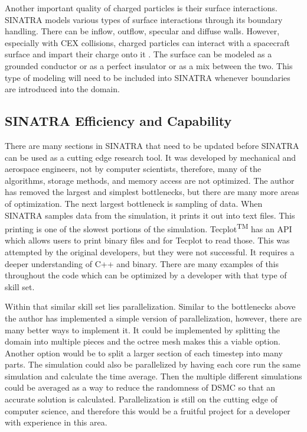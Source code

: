\indent Another important quality of charged particles is their surface interactions. SINATRA models various types of surface interactions through its boundary handling. There can be inflow, outflow, specular and diffuse walls. However, especially with CEX collisions, charged particles can interact with a spacecraft surface and impart their charge onto it \cite{surface_charge}. The surface can be modeled as a grounded conductor or as a perfect insulator or as a mix between the two. This type of modeling will need to be included into SINATRA whenever boundaries are introduced into the domain.

\subsection{SINATRA Efficiency and Capability}
\label{sec:auto_mesh}
There are many sections in SINATRA that need to be updated before SINATRA can be used as a cutting edge research tool. It was developed by mechanical and aerospace engineers, not by computer scientists, therefore, many of the algorithms, storage methods, and memory access are not optimized. The author has removed the largest and simplest bottlenecks, but there are many more areas of optimization. The next largest bottleneck is sampling of data. When SINATRA samples data from the simulation, it prints it out into text files. This printing is one of the slowest portions of the simulation. Tecplot\textsuperscript{TM} has an API which allows users to print binary files and for Tecplot to read those. This was attempted by the original developers, but they were not successful. It requires a deeper understanding of C++ and binary. There are many examples of this throughout the code which can be optimized by a developer with that type of skill set. \par

\indent Within that similar skill set lies parallelization. Similar to the bottlenecks above the author has implemented a simple version of parallelization, however, there are many better ways to implement it. It could be implemented by splitting the domain into multiple pieces and the octree mesh makes this a viable option. Another option would be to split a larger section of each timestep into many parts. The simulation could also be parallelized by having each core run the same simulation and calculate the time average. Then the multiple different simulations could be averaged as a way to reduce the randomness of DSMC so that an accurate solution is calculated. Parallelization is still on the cutting edge of computer science, and therefore this would be a fruitful project for a developer with experience in this area. \par

